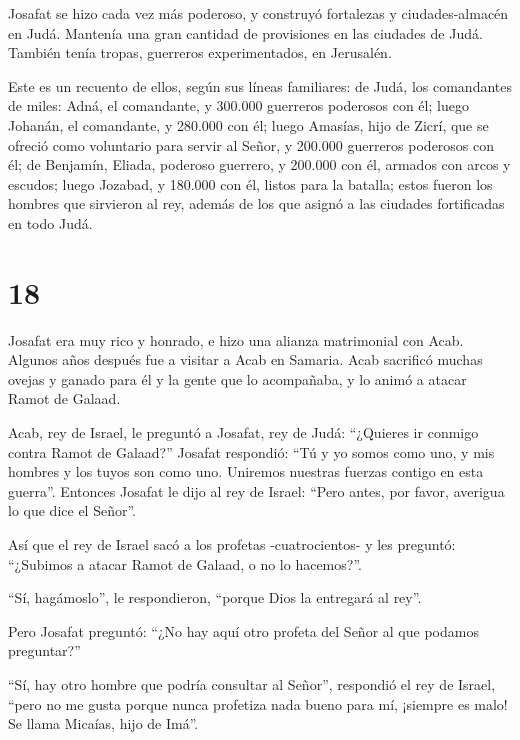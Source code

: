  Josafat se hizo cada vez más poderoso, y construyó
fortalezas y ciudades-almacén en Judá.  Mantenía una gran
cantidad de provisiones en las ciudades de Judá. También tenía tropas,
guerreros experimentados, en Jerusalén.

 Este es un recuento de ellos, según sus líneas familiares:
de Judá, los comandantes de miles: Adná, el comandante, y 300.000
guerreros poderosos con él;  luego Johanán, el comandante,
y 280.000 con él;  luego Amasías, hijo de Zicrí, que se
ofreció como voluntario para servir al Señor, y 200.000 guerreros
poderosos con él;  de Benjamín, Eliada, poderoso guerrero,
y 200.000 con él, armados con arcos y escudos;  luego
Jozabad, y 180.000 con él, listos para la batalla;  estos
fueron los hombres que sirvieron al rey, además de los que asignó a las
ciudades fortificadas en todo Judá.

\hypertarget{section-17}{%
\section{18}\label{section-17}}

 Josafat era muy rico y honrado, e hizo una alianza
matrimonial con Acab.  Algunos años después fue a visitar a
Acab en Samaria. Acab sacrificó muchas ovejas y ganado para él y la
gente que lo acompañaba, y lo animó a atacar Ramot de Galaad.

 Acab, rey de Israel, le preguntó a Josafat, rey de Judá:
``¿Quieres ir conmigo contra Ramot de Galaad?'' Josafat respondió: ``Tú
y yo somos como uno, y mis hombres y los tuyos son como uno. Uniremos
nuestras fuerzas contigo en esta guerra''.  Entonces Josafat
le dijo al rey de Israel: ``Pero antes, por favor, averigua lo que dice
el Señor''.

 Así que el rey de Israel sacó a los profetas
-cuatrocientos- y les preguntó: ``¿Subimos a atacar Ramot de Galaad, o
no lo hacemos?''.

``Sí, hagámoslo'', le respondieron, ``porque Dios la entregará al rey''.

 Pero Josafat preguntó: ``¿No hay aquí otro profeta del
Señor al que podamos preguntar?''

 ``Sí, hay otro hombre que podría consultar al Señor'',
respondió el rey de Israel, ``pero no me gusta porque nunca profetiza
nada bueno para mí, ¡siempre es malo! Se llama Micaías, hijo de Imá''.

